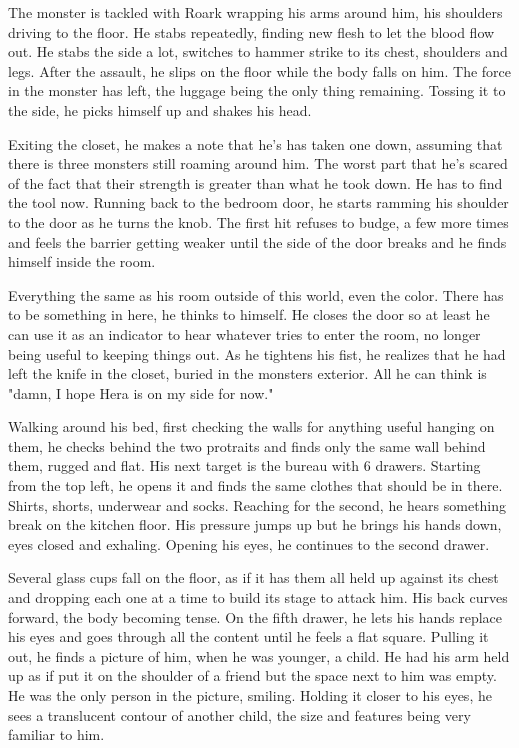         The monster is tackled with Roark wrapping his arms around him, his shoulders driving to the floor. He stabs repeatedly, finding new
    flesh to let the blood flow out. He stabs the side a lot, switches to hammer strike to its chest, shoulders and legs. After the assault, he
    slips on the floor while the body falls on him. The force in the monster has left, the luggage being the only thing remaining. Tossing it
    to the side, he picks himself up and shakes his head.

        Exiting the closet, he makes a note that he's has taken one down, assuming that there is three monsters still roaming around him. The
    worst part that he's scared of the fact that their strength is greater than what he took down. He has to find the tool now. Running back to
    the bedroom door, he starts ramming his shoulder to the door as he turns the knob. The first hit refuses to budge, a few more times and 
    feels the barrier getting weaker until the side of the door breaks and he finds himself inside the room.

        Everything the same as his room outside of this world, even the color. There has to be something in here, he thinks to himself. He closes
    the door so at least he can use it as an indicator to hear whatever tries to enter the room, no longer being useful to keeping things out.
    As he tightens his fist, he realizes that he had left the knife in the closet, buried in the monsters exterior. All he can think is "damn,
    I hope Hera is on my side for now."

        Walking around his bed, first checking the walls for anything useful hanging on them, he checks behind the two protraits and finds
    only the same wall behind them, rugged and flat. His next target is the bureau with 6 drawers. Starting from the top left, he opens it and
    finds the same clothes that should be in there. Shirts, shorts, underwear and socks. Reaching for the second, he hears something break on
    the kitchen floor. His pressure jumps up but he brings his hands down, eyes closed and exhaling. Opening his eyes, he continues to the second
    drawer.

        Several glass cups fall on the floor, as if it has them all held up against its chest and dropping each one at a time to build its
    stage to attack him. His back curves forward, the body becoming tense. On the fifth drawer, he lets his hands replace his eyes and goes
    through all the content until he feels a flat square. Pulling it out, he finds a picture of him, when he was younger, a child. He had his
    arm held up as if put it on the shoulder of a friend but the space next to him was empty. He was the only person in the picture, smiling.
    Holding it closer to his eyes, he sees a translucent contour of another child, the size and features being very familiar to him. 

